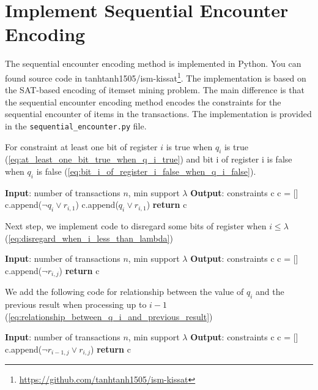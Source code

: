\section{Implement Sequential Encounter Encoding}

The sequential encounter encoding method is implemented in Python.
You can found source code in tanhtanh1505/ism-kissat\footnote{\url{https://github.com/tanhtanh1505/ism-kissat}}.
The implementation is based on the SAT-based encoding of itemset mining problem.
The main difference is that the sequential encounter encoding method encodes the constraints for the sequential encounter of items in the transactions.
The implementation is provided in the \texttt{sequential\_encounter.py} file.

For constraint at least one bit of register $i$ is true when $q_i$ is true (\ref{eq:at_least_one_bit_true_when_q_i_true})
and bit i of register i is false when $q_i$ is false (\ref{eq:bit_i_of_register_i_false_when_q_i_false}).
\begin{algorithm}
    \begin{algorithmic}[1]
        \State \textbf{Input}: number of transactions $n$, min support $\lambda$
        \State \textbf{Output}: constraints c
        \State c = []
        \State c.append($\neg q_i \vee r_{i,1}$)
        \State c.append($q_i \vee r_{i,1}$)
        \EndIf
        \EndFor
        \State \textbf{return} c
    \end{algorithmic}
\end{algorithm}

\vspace{15cm}
Next step, we implement code to disregard some bits of register
when $i \le \lambda$ (\ref{eq:disregard_when_i_less_than_lambda})
\begin{algorithm}
    \begin{algorithmic}[1]
        \State \textbf{Input}: number of transactions $n$, min support $\lambda$
        \State \textbf{Output}: constraints c
        \State c = []
        \State c.append($\neg r_{i,j}$)
        \EndFor
        \EndFor
        \State \textbf{return} c
    \end{algorithmic}
\end{algorithm}

We add the following code for relationship between the value of $q_i$ and the previous result when processing up to $i-1$ (\ref{eq:relationship_between_q_i_and_previous_result})
\begin{algorithm}
    \begin{algorithmic}[1]
        \State \textbf{Input}: number of transactions $n$, min support $\lambda$
        \State \textbf{Output}: constraints c
        \State c = []
        \State c.append($\neg r_{i-1,j} \vee r_{i,j}$)
        \EndFor
        \EndFor
        \State \textbf{return} c
    \end{algorithmic}
\end{algorithm}

